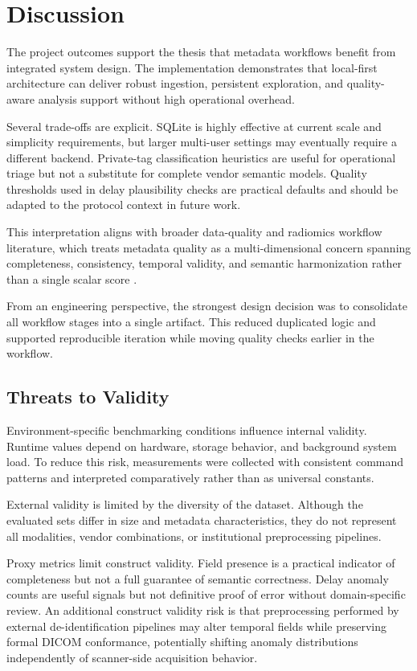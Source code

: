 \chapter{Discussion}
The project outcomes support the thesis that metadata workflows benefit from integrated system design. The implementation demonstrates that local-first architecture can deliver robust ingestion, persistent exploration, and quality-aware analysis support without high operational overhead.

Several trade-offs are explicit. SQLite is highly effective at current scale and simplicity requirements, but larger multi-user settings may eventually require a different backend. Private-tag classification heuristics are useful for operational triage but not a substitute for complete vendor semantic models. Quality thresholds used in delay plausibility checks are practical defaults and should be adapted to the protocol context in future work.

This interpretation aligns with broader data-quality and radiomics workflow literature, which treats metadata quality as a multi-dimensional concern spanning completeness, consistency, temporal validity, and semantic harmonization rather than a single scalar score \cite{cancers17193213,erdal_remix}.

From an engineering perspective, the strongest design decision was to consolidate all workflow stages into a single artifact. This reduced duplicated logic and supported reproducible iteration while moving quality checks earlier in the workflow.

\section{Threats to Validity}
Environment-specific benchmarking conditions influence internal validity. Runtime values depend on hardware, storage behavior, and background system load. To reduce this risk, measurements were collected with consistent command patterns and interpreted comparatively rather than as universal constants.

External validity is limited by the diversity of the dataset. Although the evaluated sets differ in size and metadata characteristics, they do not represent all modalities, vendor combinations, or institutional preprocessing pipelines.

Proxy metrics limit construct validity. Field presence is a practical indicator of completeness but not a full guarantee of semantic correctness. Delay anomaly counts are useful signals but not definitive proof of error without domain-specific review.
An additional construct validity risk is that preprocessing performed by external de-identification pipelines may alter temporal fields while preserving formal DICOM conformance, potentially shifting anomaly distributions independently of scanner-side acquisition behavior.

